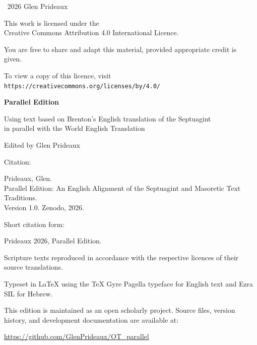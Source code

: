 \clearpage
\thispagestyle{empty}
\vspace*{\fill}

\small
\textcopyright\ 2026 Glen Prideaux

\vspace{1em}

This work is licensed under the\\
Creative Commons Attribution 4.0 International Licence.

\vspace{1em}

You are free to share and adapt this material,
provided appropriate credit is given.

\vspace{1em}

To view a copy of this licence, visit\\
\texttt{https://creativecommons.org/licenses/by/4.0/}

\vspace{2em}

\textbf{\propertitle Parallel Edition}

Using text based on Brenton's English translation of the Septuagint\\
in parallel with the World English Translation

\vspace{1em}

Edited by Glen Prideaux

\vspace{2em}

{
\setlength{\parindent}{1cm}%
\noindent Citation:\par
\indent Prideaux, Glen.\\
\indent \propertitle Parallel Edition: An English Alignment of the Septuagint and Masoretic Text Traditions.\\
\indent Version 1.0. Zenodo, 2026.\\
\indent 

\noindent Short citation form:\par
\indent Prideaux 2026, \propertitle Parallel Edition.
}

\vspace{2em}

Scripture texts reproduced in accordance with the respective licences
of their source translations.

\vspace{2em}

Typeset in \LaTeX{} using the \TeX{} Gyre Pagella typeface for English
text and Ezra SIL for Hebrew.

This edition is maintained as an open scholarly project.
Source files, version history, and development documentation are available at:

\href{https://github.com/GlenPrideaux/OT\_parallel}{https://github.com/GlenPrideaux/OT\_parallel}


